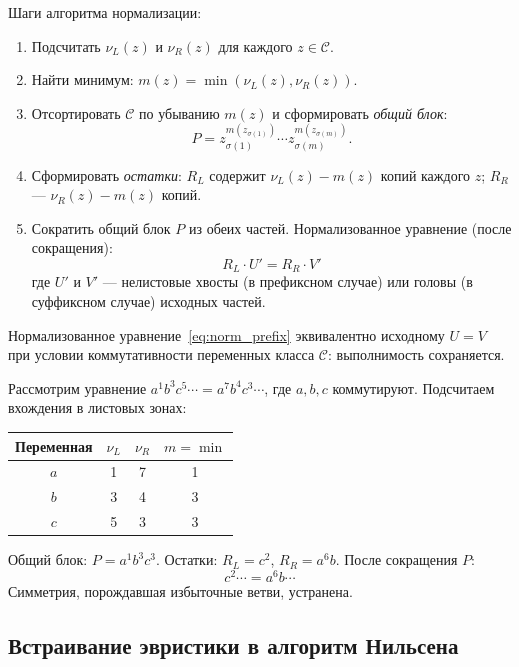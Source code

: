 \documentclass[14pt, russian]{scrartcl}
\begin{document}
Шаги алгоритма нормализации:
\begin{enumerate}
\item Подсчитать $\nu_L(z)$ и $\nu_R(z)$ для каждого $z \in \mathcal{C}$.
\item Найти минимум: $m(z) = \min(\nu_L(z), \nu_R(z))$.
\item Отсортировать $\mathcal{C}$ по убыванию $m(z)$ и сформировать
  \emph{общий блок}:
  \[
  P = z_{\sigma(1)}^{m(z_{\sigma(1)})} \cdots z_{\sigma(m)}^{m(z_{\sigma(m)})}.
  \]
\item Сформировать \emph{остатки}: $R_L$ содержит $\nu_L(z) - m(z)$ копий
  каждого $z$; $R_R$ --- $\nu_R(z) - m(z)$ копий.
\item Сократить общий блок $P$ из обеих частей. Нормализованное уравнение
  (после сокращения):
\begin{equation}\label{eq:norm_prefix}
R_L \cdot U' = R_R \cdot V'
\end{equation}
где $U'$ и $V'$ --- нелистовые хвосты (в префиксном случае) или головы
(в суффиксном случае) исходных частей.
\end{enumerate}

\begin{Lemma}
Нормализованное уравнение~\eqref{eq:norm_prefix} эквивалентно исходному
$U = V$ при условии коммутативности переменных класса $\mathcal{C}$:
выполнимость сохраняется.
\end{Lemma}

\begin{Example}
Рассмотрим уравнение $a^1 b^3 c^5 \cdots = a^7 b^4 c^3 \cdots$, где $a, b, c$
коммутируют. Подсчитаем вхождения в листовых зонах:

\begin{center}
\begin{tabular}{|c|c|c|c|}
\hline
Переменная & $\nu_L$ & $\nu_R$ & $m = \min$ \\
\hline
$a$ & 1 & 7 & 1 \\
$b$ & 3 & 4 & 3 \\
$c$ & 5 & 3 & 3 \\
\hline
\end{tabular}
\end{center}

Общий блок: $P = a^1 b^3 c^3$. Остатки: $R_L = c^2$, $R_R = a^6 b$.
После сокращения $P$:
\[
c^2 \cdots = a^6 b \cdots
\]
Симметрия, порождавшая избыточные ветви, устранена.
\end{Example}

\subsection{Встраивание эвристики в алгоритм Нильсена}
\end{document}
